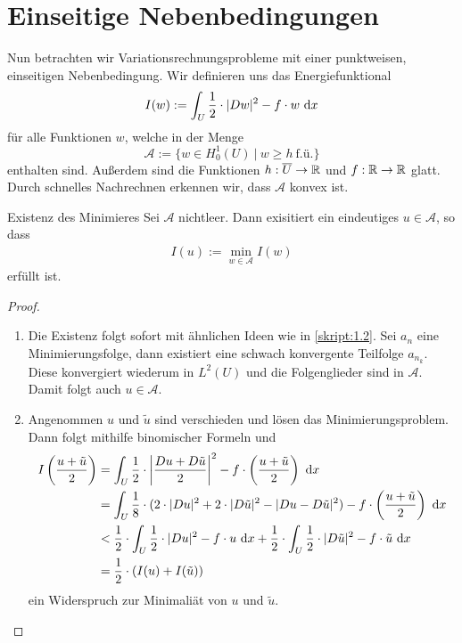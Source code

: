 \section{Einseitige Nebenbedingungen}
Nun betrachten wir Variationsrechnungsprobleme mit einer punktweisen, einseitigen Nebenbedingung.
Wir definieren uns das Energiefunktional
\begin{equation}\label{equ:2.1}
I(w) :=
\int_U \frac{1}{2} \cdot | Dw |^2 - f  \cdot w \ \text{\rmfamily d} x
\end{equation}
für alle Funktionen $w$, welche in der Menge
\begin{equation}\label{equ:2.2}
\mathcal{A}
:= 
\lbrace w \in H_0^1(U) \ | \ w \geq h \ \text{f.ü.} \rbrace
\end{equation}
enthalten sind. Außerdem sind die Funktionen $h : \overline{U} \to \mathbb{R}$ und $f : \mathbb{R} \to \mathbb{R}$ glatt.
Durch schnelles Nachrechnen erkennen wir, dass $\mathcal{A}$ konvex ist.

\begin{genericthm}{Existenz des Minimieres}\label{skript:2.1}
Sei $\mathcal{A}$ nichtleer.
Dann exisitiert ein eindeutiges $u \in \mathcal{A}$, so dass
\begin{align*}
I(u) := \min \limits_{w \in \mathcal{A}} I(w) 
\end{align*}
erfüllt ist.
\end{genericthm}

\begin{proof}
\begin{enumerate}

\item[\textbf{(1)}]
Die Existenz folgt sofort mit ähnlichen Ideen wie in \ref{skript:1.2}.
Sei $a_n$ eine Minimierungsfolge, dann existiert eine schwach konvergente Teilfolge $a_{n_k}$.
Diese konvergiert wiederum in $L^2(U)$ und die Folgenglieder sind in $\mathcal{A}$.
Damit folgt auch $u \in \mathcal{A}$.

\item[\textbf{(2)}]
Angenommen $u$ und $\tilde{u}$ sind verschieden und lösen das Minimierungsproblem.
Dann folgt mithilfe binomischer Formeln und
\begin{align*}
I\left( \frac{u + \tilde{u}}{2} \right)
&=
\int_U \frac{1}{2} \cdot \left| \frac{Du + D\tilde{u}}{2} \right|^2 - f \cdot \left( \frac{u + \tilde{u}}{2} \right) \ \text{\rmfamily d} x\\
&= 
\int_U \frac{1}{8} \cdot ( 2 \cdot |Du|^2 + 2 \cdot |D \tilde{u} |^2 - | Du - D\tilde{u}|^2)  - f \cdot \left( \frac{u + \tilde{u}}{2} \right) \ \text{\rmfamily d} x\\
&<
\frac{1}{2} \cdot \int_U \frac{1}{2} \cdot|Du|^2 - f \cdot u  \ \text{\rmfamily d} x 
+ 
\frac{1}{2} \cdot \int_U \frac{1}{2} \cdot | D \tilde{u} |^2 - f \cdot \tilde{u} \ \text{\rmfamily d} x\\
&=
\frac{1}{2} \cdot( I(u) + I(\tilde{u}))
\end{align*}
ein Widerspruch zur Minimaliät von $u$ und $\tilde{u}$.
\end{enumerate}
\end{proof}

